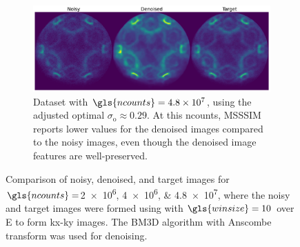 \begin{figure}
    \begin{subfigure}[b]{1\linewidth}
        \centering
        \includegraphics[width=1\linewidth]{images/noisy_denoised_ref_48M_avg_bm3d.pdf}
        \caption{Dataset with $\gls{ncounts}=\num{4.8e7}$, using the adjusted optimal $\sigma_{\text{o}}\approx0.29$. At this \gls{ncounts}, \gls{MSSSIM} reports lower values for the denoised images compared to the noisy images, even though the denoised image features are well-preserved.}
        \label{fig:noisy-denoised-ref-48M-avg-bm3d}
    \end{subfigure}

    \caption{Comparison of noisy, denoised, and target images for $\gls{ncounts}=$\numlist{2e6;4e6;4.8e7}, where the noisy and target images were formed using with $\gls{winsize}=\num{10}$ over \gls{E} to form \gls{kx}-\gls{ky} images. The \gls{BM3D} algorithm with Anscombe transform was used for denoising.}
    \label{fig:combined-noisy-denoised}
\end{figure}
